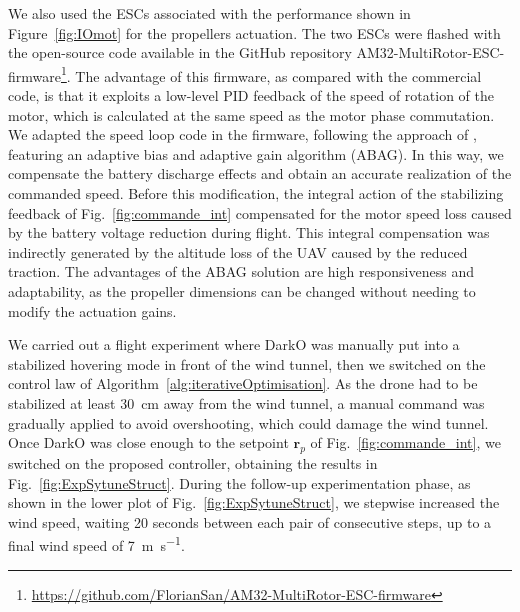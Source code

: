 We also used the ESCs associated with the performance shown in Figure~\ref{fig:IOmot} for the propellers actuation. The two ESCs were flashed with the open-source code available in the GitHub repository AM32-MultiRotor-ESC-firmware\footnote{\url{https://github.com/FlorianSan/AM32-MultiRotor-ESC-firmware}}. The advantage of this firmware, as compared with the commercial code, is that it exploits a low-level PID feedback of the speed of rotation of the motor, which is calculated at the same speed as the motor phase commutation. We adapted the speed loop code in the firmware, following the approach of \cite{franchi2017}, featuring an adaptive bias and adaptive gain algorithm (ABAG). In this way, we compensate the battery discharge effects and obtain an accurate realization of the commanded speed. Before this modification, the integral action of the stabilizing feedback of Fig.~\ref{fig:commande_int} compensated for the motor speed loss caused by the battery voltage reduction during flight. This integral compensation was indirectly generated by the altitude loss of the UAV caused by the reduced traction. The advantages of the ABAG solution are high responsiveness and adaptability, as the propeller dimensions can be changed without needing to modify the actuation gains.

We carried out a flight experiment where DarkO was manually put into a stabilized hovering mode in front of the wind tunnel, then we switched on the control law of Algorithm~\ref{alg:iterativeOptimisation}. As the drone had to be stabilized at least \SI{30}{\centi\meter} away from the wind tunnel, a manual command was gradually applied to avoid overshooting, which could damage the wind tunnel. Once DarkO was close enough to the setpoint $\boldsymbol{r}_{p}$ of Fig.~\ref{fig:commande_int}, we switched on the proposed controller, obtaining the results in Fig.~\ref{fig:ExpSytuneStruct}. During the follow-up experimentation phase, as shown in the lower plot of Fig.~\ref{fig:ExpSytuneStruct}, we stepwise increased the wind speed, waiting 20 seconds between each  pair of consecutive steps, up to a final wind speed of \SI{7}{\meter\per\second}.

